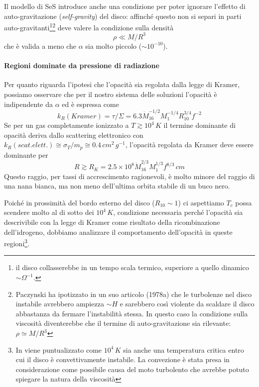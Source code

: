 \documentclass[a4paperbi]{article}
\begin{document}
	Il modello di SeS introduce anche una condizione per poter ignorare l'effetto di auto-gravitazione (\textit{self-gravity}) del disco: affinché questo non si separi in parti auto-gravitanti\footnote{il disco collasserebbe in un tempo scala termico, superiore a quello dinamico $\sim\Omega^{-1}$.}\footnote{Paczynski ha ipotizzato in un suo articolo (1978a) che le turbolenze nel disco instabile avrebbero ampiezza $\sim H$ e sarebbero così violente da scaldare il disco abbastanza da fermare l'instabilità stessa. In questo caso la condizione sulla viscosità diventerebbe che il termine di auto-gravitazione sia rilevante: $\rho\simeq M/R^3$} deve valere la condizione sulla densità
		\begin{equation}
			\rho\ll M/R^3
		\end{equation}
	che è valida a meno che $\alpha$ sia molto piccolo ($\sim10^{-10}$).
	
	\paragraph{Regioni dominate da pressione di radiazione}
	Per quanto riguarda l'ipotesi che l'opacità sia regolata dalla legge di Kramer, possiamo osservare che per il nostro sistema delle soluzioni l'opacità è indipendente da $\alpha$ ed è espressa come
	\begin{equation}
		k_R(Kramer)=\tau/\Sigma=6.3\dot{M}^{-1/2}_{16}M^{-1/4}_1R^{3/4}_{10}f^{-2}
	\end{equation}
	Se per un gas completamente ionizzato a $T\gtrsim10^4\,K$ il termine dominante di opacità deriva dallo scattering elettronico con $k_R(scat. elett.)\cong\sigma_T/m_p\cong0.4\,cm^2\,g^{-1}$, l'opacità regolata da Kramer deve essere dominante per	
	\begin{equation}
		R\gtrsim R_K=2.5\times10^8\dot{M}^{2/3}_{16}M^{1/3}_1f^{8/3}\,cm
	\end{equation}
	Questo raggio, per tassi di accrescimento ragionevoli, è molto minore del raggio di una nana bianca, ma non meno dell'ultima orbita stabile di un buco nero.
	
	Poiché in prossimità del bordo esterno del disco ($R_{10}\sim1$) ci aspettiamo $T_c$ possa scendere molto al di sotto dei $10^4\,K$, condizione necessaria perché l'opacità sia descrivibile con la legge di Kramer come risultato della ricombinazione dell'idrogeno, dobbiamo analizzare il comportamento dell'opacità in queste regioni\footnote{In \cite{Pringle1981} viene puntualizzato come $10^4\,K$ sia anche una temperatura critica entro cui il disco è convettivamente instabile. La convezione è stata presa in considerazione come possibile causa del moto turbolento che avrebbe potuto spiegare la natura della viscosità}.
	
\end{document}
